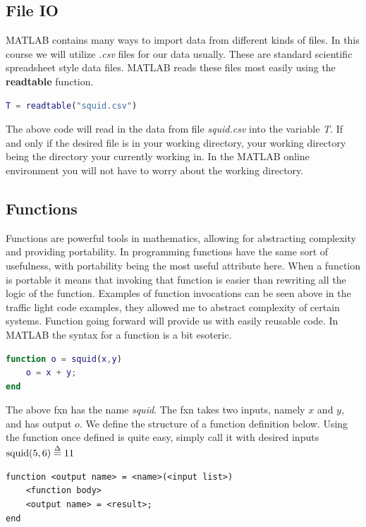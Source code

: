 \documentclass[12pt]{article}
\begin{document}
		\subsection{File IO}
			MATLAB contains many ways to import data from different kinds of files.
			In this course we will utilize \textit{.csv} files for our data usually.
			These are standard scientific spreadsheet style data files.
			MATLAB reads these files most easily using the \textbf{readtable} function.
			\begin{lstlisting}[style=code, language=MATLAB]
T = readtable("squid.csv")
			\end{lstlisting}
			The above code will read in the data from file \textit{squid.csv} into the variable \textit{T}.
			If and only if the desired file is in your working directory,
				your working directory being the directory your currently working in.
			In the MATLAB online environment you will not have to worry about the working directory.
			
		\subsection{Functions}
			Functions are powerful tools in mathematics,
				allowing for abstracting complexity and providing portability.
			In programming functions have the same sort of usefulness,
				with portability being the most useful attribute here.
			When a function is portable it means that invoking that function is easier than rewriting all the logic of the function.
			Examples of function invocations can be seen above in the traffic light code examples,
				they allowed me to abstract complexity of certain systems.
			Function going forward will provide us with easily reusable code.
			In MATLAB the syntax for a function is a bit esoteric.
			\begin{lstlisting}[style=code, language=MATLAB]
function o = squid(x,y)
	o = x + y;
end
			\end{lstlisting}
			The above fxn has the name \textit{squid}.
			The fxn takes two inputs,
				namely $x$ and $y$,
				and has output $o$.
			We define the structure of a function definition below.
			Using the function once defined is quite easy,
				simply call it with desired inputs $\text{squid}(5,6) \stackrel{\text{$\Delta$}}{=} 11$
			\begin{lstlisting}[style=pseudocode]
function <output name> = <name>(<input list>)
	<function body>
	<output name> = <result>;
end
			\end{lstlisting}
\end{document}
